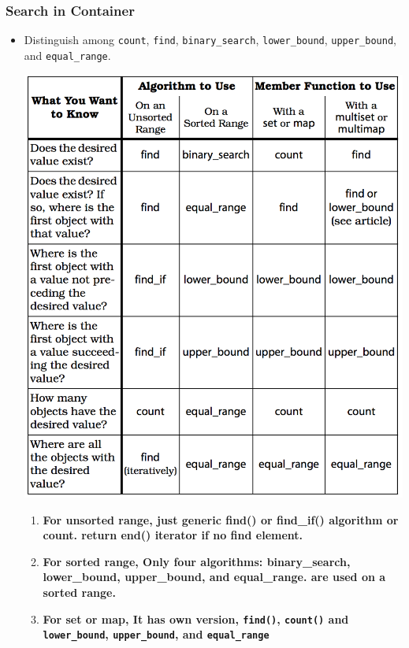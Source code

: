 \documentclass[a4paper,11pt,twoside]{book}
\begin{document}
\subsubsection{Search in Container}
\begin{itemize}
\item Distinguish among \texttt{count}, \texttt{find}, \texttt{binary\_search}, \texttt{lower\_bound}, \texttt{upper\_bound}, and \texttt{equal\_range}.

\begin{center}
	\includegraphics[scale=0.6]{pics/distinguish.png}
\end{center}

\begin{enumerate}
\item \textbf{For unsorted range, just generic find() or find\_if() algorithm or count. return end() iterator if no find element.}

\item \textbf{For sorted range, Only four algorithms: binary\_search, lower\_bound, upper\_bound, and equal\_range. are used on a sorted range.}

\item \textbf{For set or map, It has own version, \texttt{find()}, \texttt{count()} and \texttt{lower\_bound}, \texttt{upper\_bound}, and \texttt{equal\_range}}


\end{enumerate}
\end{itemize}
\end{document}

